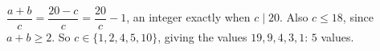 $\dfrac{a+b}{c}=\dfrac{20-c}{c}=\dfrac{20}{c}-1$, an integer exactly when $c\mid20$. Also $c\le18$, since $a+b\ge2$. So $c\in\{1,2,4,5,10\}$, giving the values $19,9,4,3,1$: $\boxed{5}$ values.
